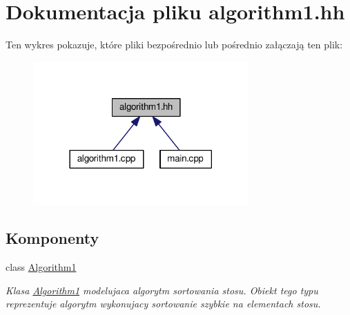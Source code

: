 \hypertarget{algorithm1_8hh}{\section{Dokumentacja pliku algorithm1.\-hh}
\label{algorithm1_8hh}
}
Ten wykres pokazuje, które pliki bezpośrednio lub pośrednio załączają ten plik\-:\nopagebreak
\begin{figure}[H]
\begin{center}
\leavevmode
\includegraphics[width=234pt]{algorithm1_8hh__dep__incl}
\end{center}
\end{figure}
\subsection*{Komponenty}
\begin{DoxyCompactItemize}
\item 
class \hyperlink{class_algorithm1}{Algorithm1}
\begin{DoxyCompactList}\small\item\em Klasa \hyperlink{class_algorithm1}{Algorithm1} modelujaca algorytm sortowania stosu. Obiekt tego typu reprezentuje algorytm wykonujacy sortowanie szybkie na elementach stosu. \end{DoxyCompactList}\end{DoxyCompactItemize}
